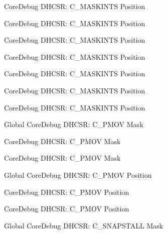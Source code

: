 \begin{DoxyRefList}
\label{deprecated__deprecated000586}%
%
Core\+Debug DHCSR\+: C\+\_\+\+MASKINTS Position 

\label{deprecated__deprecated000121}%
%
Core\+Debug DHCSR\+: C\+\_\+\+MASKINTS Position 

\label{deprecated__deprecated000395}%
%
Core\+Debug DHCSR\+: C\+\_\+\+MASKINTS Position 

\label{deprecated__deprecated000033}%
%
Core\+Debug DHCSR\+: C\+\_\+\+MASKINTS Position 

\label{deprecated__deprecated000260}%
%
Core\+Debug DHCSR\+: C\+\_\+\+MASKINTS Position 

\label{deprecated__deprecated000484}%
%
Core\+Debug DHCSR\+: C\+\_\+\+MASKINTS Position 

\label{deprecated__deprecated000177}%
%
Core\+Debug DHCSR\+: C\+\_\+\+MASKINTS Position  
\item[Global \doxylink{group___c_m_s_i_s___s_c_b_ga6c41fddb98d97a17f3e9020278a1aed1}{Core\+Debug\+\_\+\+DHCSR\+\_\+\+C\+\_\+\+PMOV\+\_\+\+Msk} ]\label{deprecated__deprecated000481}%
%
Core\+Debug DHCSR\+: C\+\_\+\+PMOV Mask 

\label{deprecated__deprecated000583}%
%
Core\+Debug DHCSR\+: C\+\_\+\+PMOV Mask 

\label{deprecated__deprecated000030}%
%
Core\+Debug DHCSR\+: C\+\_\+\+PMOV Mask  
\item[Global \doxylink{group___c_m_s_i_s___s_c_b_gac414659dd5c8bd9c91ab94441ded720a}{Core\+Debug\+\_\+\+DHCSR\+\_\+\+C\+\_\+\+PMOV\+\_\+\+Pos} ]\label{deprecated__deprecated000029}%
%
Core\+Debug DHCSR\+: C\+\_\+\+PMOV Position 

\label{deprecated__deprecated000582}%
%
Core\+Debug DHCSR\+: C\+\_\+\+PMOV Position 

\label{deprecated__deprecated000480}%
%
Core\+Debug DHCSR\+: C\+\_\+\+PMOV Position  
\item[Global \doxylink{group___c_m_s_i_s___core_debug_ga53aa99b2e39a67622f3b9973e079c2b4}{Core\+Debug\+\_\+\+DHCSR\+\_\+\+C\+\_\+\+SNAPSTALL\+\_\+\+Msk} ]\label{deprecated__deprecated000032}%
%
Core\+Debug DHCSR\+: C\+\_\+\+SNAPSTALL Mask 


\end{DoxyRefList}
